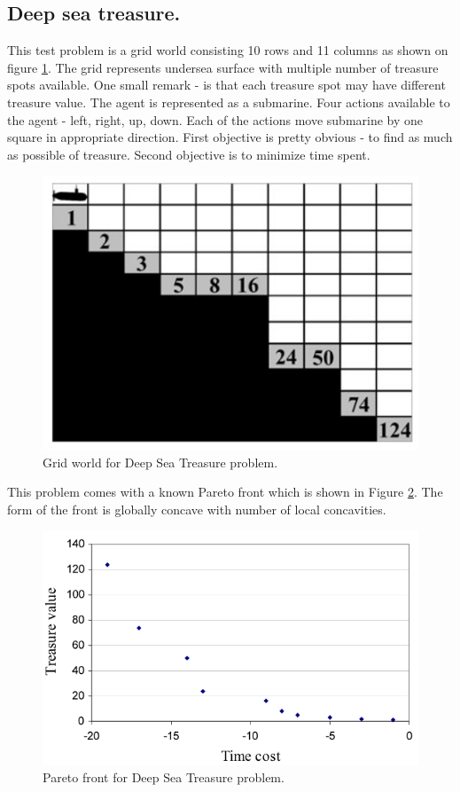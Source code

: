 {{\subsection{Deep sea treasure.}
This test problem is a grid world consisting 10 rows and 11 columns as shown on figure \ref{fig:DSTOverview}. The grid represents undersea surface with multiple number of treasure spots available. One small remark - is that each treasure spot may have different treasure value. The agent is represented as a submarine. Four actions available to the agent - left, right, up, down. Each of the actions move submarine by one square in appropriate direction. First objective is pretty obvious - to find as much as possible of treasure. Second objective is to minimize time spent. \\
\begin{figure}[ht]
\vskip 0.2in
\centering
\includegraphics[scale=0.9]{dst.png}
\caption{Grid world for Deep Sea Treasure problem.}
\label{fig:DSTOverview}
\end{figure}

This problem comes with a known Pareto front which is shown in Figure \ref{fig:DSTFront}. The form of the front is globally concave with number of local concavities.
\begin{figure}[ht]
\vskip 0.2in
\centering
\includegraphics[scale=0.9]{dstPareto.png}
\caption{Pareto front for Deep Sea Treasure problem.}
\label{fig:DSTFront}
\end{figure}

}}
